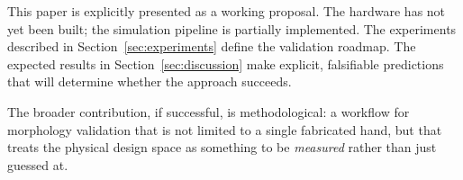 \documentclass[journal]{IEEEtran}
\begin{document}
This paper is explicitly presented as a working proposal.
The hardware has not yet been built; the simulation pipeline is partially implemented.
The experiments described in Section~\ref{sec:experiments} define the validation roadmap.
The expected results in Section~\ref{sec:discussion} make explicit, falsifiable predictions
that will determine whether the approach succeeds.

The broader contribution, if successful, is methodological: a workflow for morphology
validation that is not limited to a single fabricated hand, but that treats the physical
design space as something to be \emph{measured} rather than just guessed at.



\end{document}
